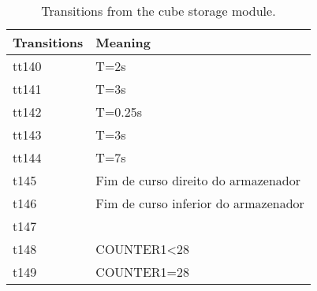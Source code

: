 \begin{table}[htbp]
\caption{Transitions from the cube storage module.}
\centering
\begin{tabular}{ll}
Transitions & Meaning\\
\hline
tt140 & T=2s\\
tt141 & T=3s\\
tt142 & T=0.25s\\
tt143 & T=3s\\
tt144 & T=7s\\
t145 & Fim de curso direito do armazenador\\
t146 & Fim de curso inferior do armazenador\\
t147 & \\
t148 & COUNTER1<28\\
t149 & COUNTER1=28\\
\end{tabular}
\end{table}
